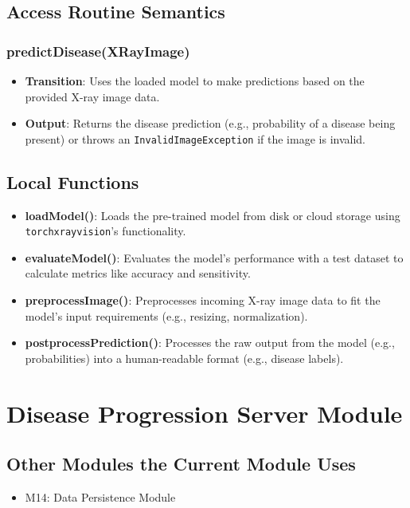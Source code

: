 \documentclass[12pt, titlepage]{article}
\begin{document}
\subsection{Access Routine Semantics}
\subsubsection{predictDisease(XRayImage)}
\begin{itemize}
    \item \textbf{Transition}: Uses the loaded model to make predictions based on the provided X-ray image data.
    \item \textbf{Output}: Returns the disease prediction (e.g., probability of a disease being present) or throws an \texttt{InvalidImageException} if the image is invalid.
\end{itemize}

\subsection{Local Functions}
\begin{itemize}
    \item \textbf{loadModel()}: Loads the pre-trained model from disk or cloud storage using \texttt{torchxrayvision}'s functionality.
    \item \textbf{evaluateModel()}: Evaluates the model’s performance with a test dataset to calculate metrics like accuracy and sensitivity.
    \item \textbf{preprocessImage()}: Preprocesses incoming X-ray image data to fit the model's input requirements (e.g., resizing, normalization).
    \item \textbf{postprocessPrediction()}: Processes the raw output from the model (e.g., probabilities) into a human-readable format (e.g., disease labels).
\end{itemize}
\newpage
\section{Disease Progression Server Module}

\subsection{Other Modules the Current Module Uses}
\begin{itemize}
    \item M14: Data Persistence Module
\end{itemize}
\end{document}
